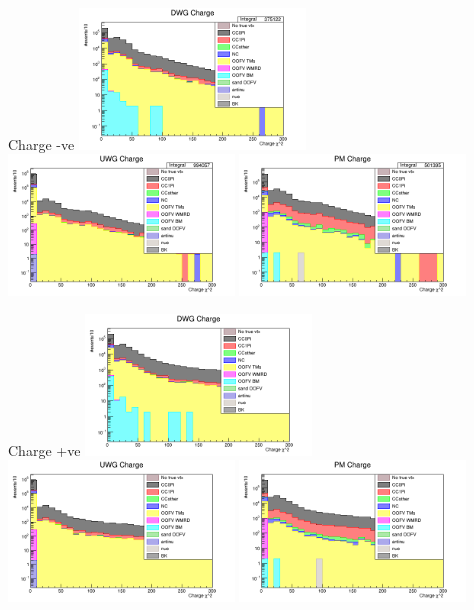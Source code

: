 \documentclass{beamer}
\begin{document}
\begin{frame}{Charge -ve}
    \includegraphics[width=0.45\textwidth]{images/charge_neg_chi2_wgbm_topo_DWG_accum_level[][26]_data_mc.png}
    \includegraphics[width=0.45\textwidth]{images/charge_neg_chi2_wgbm_topo_UWG_accum_level[][16]_data_mc.png}
    \includegraphics[width=0.45\textwidth]{images/charge_neg_chi2_wgbm_topo_PM_accum_level[][06]_data_mc.png}
\end{frame}

\begin{frame}{Charge +ve}
    \includegraphics[width=0.45\textwidth]{images/charge_pos_chi2_wgbm_topo_DWG_accum_level[][26]_data_mc.png}
    \includegraphics[width=0.45\textwidth]{images/charge_pos_chi2_wgbm_topo_UWG_accum_level[][16]_data_mc.png}
    \includegraphics[width=0.45\textwidth]{images/charge_pos_chi2_wgbm_topo_PM_accum_level[][06]_data_mc.png}
\end{frame}
\end{document}

